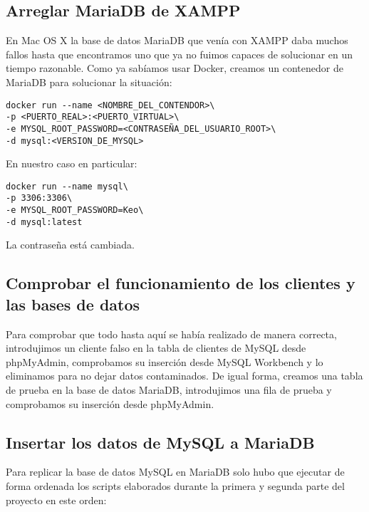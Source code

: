 \documentclass[a4paper, 11pt, oneside]{article} %
\begin{document}
\subsection{Arreglar MariaDB de XAMPP}

En Mac OS X la base de datos MariaDB que venía con XAMPP daba muchos fallos hasta que encontramos uno que ya no fuimos capaces de solucionar en un tiempo razonable. Como ya sabíamos usar Docker, creamos un contenedor de MariaDB para solucionar la situación:

\begin{verbatim}
docker run --name <NOMBRE_DEL_CONTENDOR>\
-p <PUERTO_REAL>:<PUERTO_VIRTUAL>\
-e MYSQL_ROOT_PASSWORD=<CONTRASEÑA_DEL_USUARIO_ROOT>\
-d mysql:<VERSION_DE_MYSQL>
\end{verbatim}

En nuestro caso en particular:

\begin{verbatim}
docker run --name mysql\
-p 3306:3306\
-e MYSQL_ROOT_PASSWORD=Keo\
-d mysql:latest
\end{verbatim}

La contraseña está cambiada.




\subsection{Comprobar el funcionamiento de los clientes y las bases de datos}

Para comprobar que todo hasta aquí se había realizado de manera correcta, introdujimos un cliente falso en la tabla de clientes de MySQL desde phpMyAdmin, comprobamos su inserción desde MySQL Workbench y lo eliminamos para no dejar datos contaminados. De igual forma, creamos una tabla de prueba en la base de datos MariaDB, introdujimos una fila de prueba y comprobamos su inserción desde phpMyAdmin.




\subsection{Insertar los datos de MySQL a MariaDB}

Para replicar la base de datos MySQL en MariaDB solo hubo que ejecutar de forma ordenada los scripts elaborados durante la primera y segunda parte del proyecto en este orden:
\end{document}
